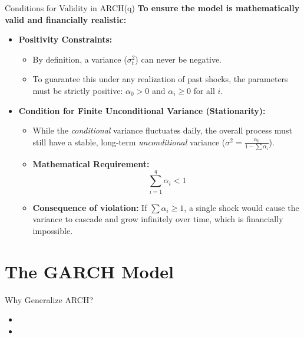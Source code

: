 \documentclass[aspectratio=169]{beamer}
\begin{document}
\begin{frame}{Conditions for Validity in ARCH(q)}
\textbf{To ensure the model is mathematically valid and financially realistic:}

\vspace{0.2cm}
\begin{itemize}
    \item \textbf{Positivity Constraints:} 
    \begin{itemize}
        \item By definition, a variance ($\sigma_t^2$) can never be negative.
        \item To guarantee this under any realization of past shocks, the parameters must be strictly positive: $\alpha_0 > 0$ and $\alpha_i \ge 0$ for all $i$.
    \end{itemize}
    
    \vspace{0.4cm}
    
    \item \textbf{Condition for Finite Unconditional Variance (Stationarity):}
    \begin{itemize}
        \item While the \textit{conditional} variance fluctuates daily, the overall process must still have a stable, long-term \textit{unconditional} variance ($\sigma^2 = \frac{\alpha_0}{1 - \sum \alpha_i}$).
        \item \textbf{Mathematical Requirement:} 
        \[ \sum_{i=1}^{q} \alpha_i < 1 \]
        \item \textbf{Consequence of violation:} If $\sum \alpha_i \ge 1$, a single shock would cause the variance to cascade and grow infinitely over time, which is financially impossible.
    \end{itemize}
\end{itemize}
\end{frame}
\section{The GARCH Model}

\begin{frame}{Why Generalize ARCH?}
\begin{itemize}
    \item %
    \item %
\end{itemize}
\end{frame}
\end{document}

